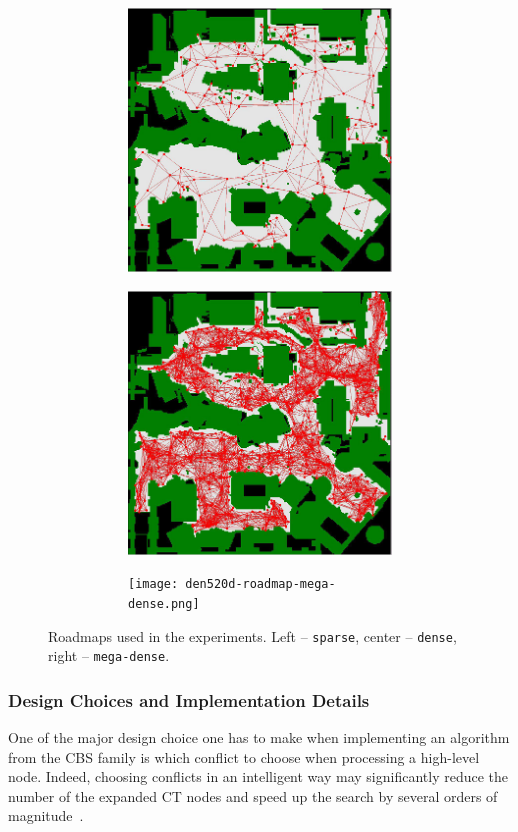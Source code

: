 \documentclass[review]{elsarticle}
\newcommand\konstantin[1]{\nb{\textbf{Konstantin:}}{red}{#1}}
\newcommand{\cbs}{\ac{CBS}\xspace}
\newcommand{\ct}{\ac{CT}\xspace}
\newcommand{\mapf}{\ac{MAPF}\xspace}
\begin{document}
\begin{figure}[t]
\centering
\begin{subfigure}
    \centering
    \begin{subfigure}
        \centering
        \includegraphics[width=0.3\linewidth]{den520d-roadmap-sparse.png}
    \end{subfigure}\hspace{0.025\linewidth}%
    \begin{subfigure}
        \centering
        \includegraphics[width=0.3\linewidth]{den520d-roadmap-dense.png}
    \end{subfigure}\hspace{0.025\linewidth}%
        \begin{subfigure}
        \centering
        \texttt{[image: den520d-roadmap-mega-dense.png]}
    \end{subfigure}%
\end{subfigure}

\caption{Roadmaps used in the experiments. Left -- \texttt{sparse}, center -- \texttt{dense}, right -- \texttt{mega-dense}.}
\label{fig:roadmaps}
\end{figure}

\subsubsection{Design Choices and Implementation Details}

One of the major design choice one has to make when implementing an algorithm from the \cbs family is which conflict to choose when processing a high-level node. 
Indeed, choosing conflicts in an intelligent way may significantly reduce the number of the expanded \ct nodes and speed up the search by several orders of magnitude~\cite{boyarski2015icbs,boyrasky2015don}.
\end{document}
